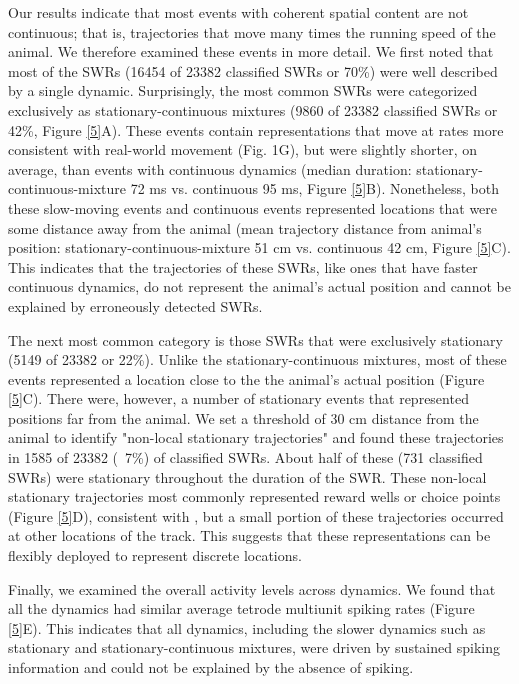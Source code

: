 \documentclass[times, twoside]{zHenriquesLab-StyleBioRxiv}
\begin{document}
Our results indicate that most events with coherent spatial content are not continuous; that is, trajectories that move many times the running speed of the animal. We therefore examined these events in more detail. We first noted that most of the SWRs (16454 of 23382 classified SWRs or 70\%) were well described by a single dynamic. Surprisingly, the most common SWRs were categorized exclusively as stationary-continuous mixtures (9860 of 23382 classified SWRs or 42\%, Figure \ref{5}A). These events contain representations that move at rates more consistent with real-world movement (Fig. 1G), but were slightly shorter, on average, than events with continuous dynamics (median duration: stationary-continuous-mixture 72 ms vs. continuous 95 ms, Figure \ref{5}B). Nonetheless, both these slow-moving events and continuous events represented locations that were some distance away from the animal (mean trajectory distance from animal's position: stationary-continuous-mixture 51 cm vs. continuous 42 cm, Figure \ref{5}C). This indicates that the trajectories of these SWRs, like ones that have faster continuous dynamics, do not represent the animal's actual position and cannot be explained by erroneously detected SWRs.

The next most common category is those SWRs that were exclusively stationary (5149 of 23382 or 22\%). Unlike the stationary-continuous mixtures, most of these events represented a location close to the the animal's actual position (Figure \ref{5}C). There were, however, a number of stationary events  that represented positions far from the animal. We set a threshold of 30 cm distance from the animal to identify "non-local stationary trajectories" and found these trajectories in 1585 of 23382 (~7\%) of classified SWRs. About half of these (731 classified SWRs) were stationary throughout the duration of the SWR. These non-local stationary trajectories most commonly represented reward wells or choice points (Figure \ref{5}D), consistent with \cite{JaiDistincthippocampalcorticalmemory2017}, but a small portion of these trajectories occurred at other locations of the track. This suggests that these representations can be flexibly deployed to represent discrete locations.

Finally, we examined the overall activity levels across dynamics. We found that all the dynamics had similar average tetrode multiunit spiking rates (Figure \ref{5}E). This indicates that all dynamics, including the slower dynamics such as stationary and stationary-continuous mixtures, were driven by sustained spiking information and could not be explained by the absence of spiking.
\end{document}
